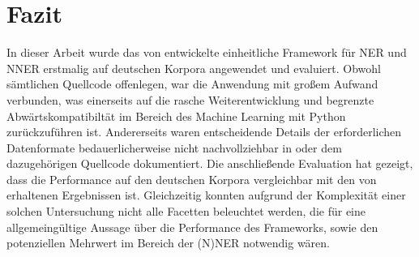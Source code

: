 

\chapter{Fazit}
\label{ch:Fazit}

In dieser Arbeit wurde das von \textcite{li2019unified} entwickelte einheitliche Framework für NER und NNER erstmalig auf deutschen Korpora angewendet und evaluiert. Obwohl  sämtlichen Quellcode offenlegen, war die Anwendung mit großem Aufwand verbunden, was einerseits auf die rasche Weiterentwicklung und begrenzte Abwärtskompatibiltät im Bereich des Machine Learning mit Python zurückzuführen ist. Andererseits waren entscheidende Details der erforderlichen Datenformate bedauerlicherweise nicht nachvollziehbar in \textcite{li2019unified} oder dem dazugehörigen Quellcode dokumentiert. Die anschließende Evaluation hat gezeigt, dass die Performance auf den deutschen Korpora vergleichbar mit den von \citeauthor{li2019unified} erhaltenen Ergebnissen ist. Gleichzeitig konnten aufgrund der Komplexität einer solchen Untersuchung nicht alle Facetten beleuchtet werden, die für eine allgemeingültige Aussage über die Performance des Frameworks, sowie den potenziellen Mehrwert im Bereich der (N)NER notwendig wären.

